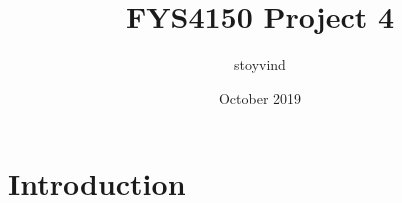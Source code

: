 \documentclass{article}
\title{FYS4150 Project 4}
\author{stoyvind }
\date{October 2019}
\begin{document}
\maketitle

\section{Introduction}
\end{document}
